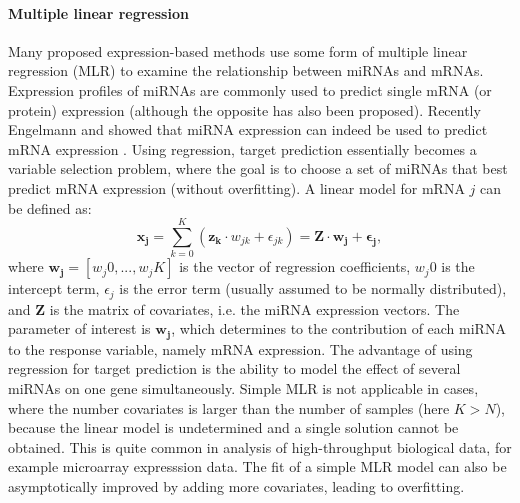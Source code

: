 \paragraph{Multiple linear regression}
Many proposed expression-based methods use some form of multiple linear
regression (MLR) to examine the relationship between miRNAs and mRNAs.
Expression profiles of miRNAs are commonly used to predict single mRNA (or protein)
expression (although the opposite has also been proposed). Recently Engelmann
and showed that miRNA expression can indeed be used to predict mRNA expression
\citep{Engelmann2012}. Using regression, target prediction essentially becomes a
variable selection problem, where the goal is to choose a set of miRNAs that
best predict mRNA expression (without overfitting). A linear model for mRNA
$j$ can be defined as:
\begin{equation}
	\mathbf{x_j} = \sum_{k=0}^{K} (\mathbf{z_k} \cdot w_{jk} + \epsilon_{jk}) =  \mathbf{Z} \cdot \mathbf{w_j} + \mathbf{\epsilon_j},
\end{equation}
where $\mathbf{w_j} = [w_j0, ..., w_jK]$ is the vector of regression
coefficients, $w_j0$ is the intercept term, $\epsilon_j$ is the error term
(usually assumed to be normally distributed), and $\mathbf{Z}$ is the matrix of
covariates, i.e. the miRNA expression vectors. The parameter of interest is
$\mathbf{w_j}$, which determines to the contribution of each miRNA to the
response variable, namely mRNA expression.
The advantage of using regression for target prediction is the ability to
model the effect of several miRNAs on one gene simultaneously.
Simple MLR is not applicable in cases, where the number covariates is larger
than the number of samples (here $K > N$), because the linear model is
undetermined and a single solution cannot be obtained. This is quite common
in analysis of high-throughput biological data, for example microarray
expresssion data. The fit of a simple MLR model can also be asymptotically
improved by adding more covariates, leading to overfitting.

